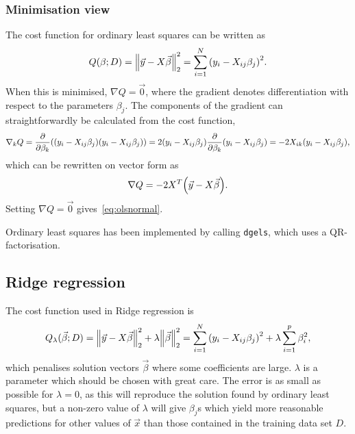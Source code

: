 \documentclass[11pt,british,a4paper]{article}
\numberwithin{equation}{section}
\begin{document}
\subsubsection{Minimisation view}
The cost function for ordinary least squares can be written as
\begin{equation}
    Q(\beta;D) = \norm{\vec{y}-X\vec{\beta}}_2^2
               = \sum_{i=1}^N \qty(y_i - X_{ij}\beta_j)^2.
\end{equation}
When this is minimised, \(\nabla Q = \vec{0}\), where the gradient denotes differentiation with respect to the parameters \(\beta_j\).
The components of the gradient can straightforwardly be calculated from the cost function,
\begin{equation}
    \nabla_k Q = \pdv{\beta_k}(\qty(y_i - X_{ij}\beta_j)\qty(y_i - X_{ij}\beta_j))
               = 2\qty(y_i-X_{ij}\beta_j) \pdv{\beta_k}(y_i-X_{ij}\beta_j)
               = -2X_{ik}\qty(y_i-X_{ij}\beta_j),\label{eq:olsgradcomp}
\end{equation}
which can be rewritten on vector form as
\begin{equation}
    \nabla Q = -2X^T\qty(\vec{y}-X\vec{\beta}).\label{eq:olsgrad}
\end{equation}
Setting \(\nabla Q = \vec{0}\) gives~\vref{eq:olsnormal}.

Ordinary least squares has been implemented by calling \lstinline{dgels}, which uses a QR-factorisation.

\subsection{Ridge regression}
The cost function used in Ridge regression is
\begin{equation}
    Q_\lambda(\vec{\beta};D) = \norm{\vec{y}-X\vec{\beta}}_2^2 + \lambda \norm{\vec{\beta}}_2^2
                             = \sum_{i=1}^N \qty(y_i - X_{ij}\beta_j)^2 + \lambda\sum_{i=1}^p \beta_i^2,
\end{equation}
which penalises solution vectors \(\vec{\beta}\) where some coefficients are large.
\(\lambda\) is a parameter which should be chosen with great care.
The error is as small as possible for \(\lambda=0\), as this will reproduce the solution found by ordinary least squares, but a non-zero value of \(\lambda\) will give \(\beta_j\)s which yield more reasonable predictions for other values of \(\vec{x}\) than those contained in the training data set \(D\)\cite{mehta}.
\end{document}

